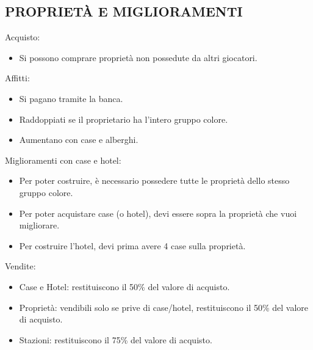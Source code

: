 \subsection{PROPRIETÀ E MIGLIORAMENTI}
Acquisto:\newline
\begin{itemize}
    \item Si possono comprare proprietà non possedute da altri giocatori.
\end{itemize}
Affitti:\newline
\begin{itemize}
    \item Si pagano tramite la banca.
    \item Raddoppiati se il proprietario ha l’intero gruppo colore.
    \item Aumentano con case e alberghi.
\end{itemize}
Miglioramenti con case e hotel:\newline
\begin{itemize}
    \item Per poter costruire, è necessario possedere tutte le proprietà dello stesso gruppo colore.
    \item Per poter acquistare case (o hotel), devi essere sopra la proprietà che vuoi migliorare.
    \item Per costruire l’hotel, devi prima avere 4 case sulla proprietà.
\end{itemize}
Vendite:\newline
\begin{itemize}
    \item Case e Hotel: restituiscono il 50\% del valore di acquisto.
    \item Proprietà: vendibili solo se prive di case/hotel, restituiscono il 50\% del valore di acquisto.
    \item Stazioni: restituiscono il 75\% del valore di acquisto.
\end{itemize}
